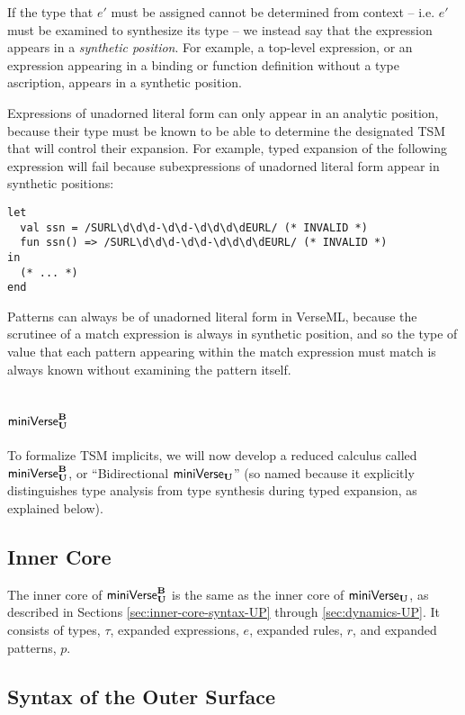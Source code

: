If the type that $e'$ must be assigned cannot be determined from context -- i.e. $e'$ must be examined to synthesize its type -- we instead say that the expression appears in a \emph{synthetic position}. For example, a top-level expression, or an expression appearing in a binding or function definition without a type ascription, appears in a synthetic position.

Expressions of unadorned literal form can only appear in an analytic position, because their type must be known to be able to determine the designated TSM that will control their expansion. For example, typed expansion of the following expression will fail because subexpressions of unadorned literal form appear in synthetic positions:\newpage
\begin{lstlisting}[numbers=none]
let 
  val ssn = /SURL\d\d\d-\d\d-\d\d\d\dEURL/ (* INVALID *)
  fun ssn() => /SURL\d\d\d-\d\d-\d\d\d\dEURL/ (* INVALID *)
in 
  (* ... *) 
end
\end{lstlisting}

Patterns can always be of unadorned literal form in VerseML, because the scrutinee of a match expression is always in synthetic position, and so the type of value that each pattern appearing within the match expression must match is always known without examining the pattern itself. 
\section{\texorpdfstring{$\mathsf{miniVerse}_\textbf{U}^\textbf{B}$}{Bidirectional miniVerseU}}\label{sec:b-miniverse}
To formalize TSM implicits, we will now develop a reduced calculus called $\mathsf{miniVerse}_\textbf{U}^\textbf{B}$, or ``Bidirectional $\mathsf{miniVerse}_\textbf{U}$'' (so named because it  explicitly distinguishes type analysis from type synthesis during typed expansion, as explained below).

\subsection{Inner Core}
The inner core of $\mathsf{miniVerse}_\textbf{U}^\textbf{B}$ is the same as the inner core of $\mathsf{miniVerse}_\textbf{U}$, as described in Sections \ref{sec:inner-core-syntax-UP} through \ref{sec:dynamics-UP}. It consists of types, $\tau$, expanded expressions, $e$, expanded rules, $r$, and expanded patterns, $p$.

\subsection{Syntax of the Outer Surface}

